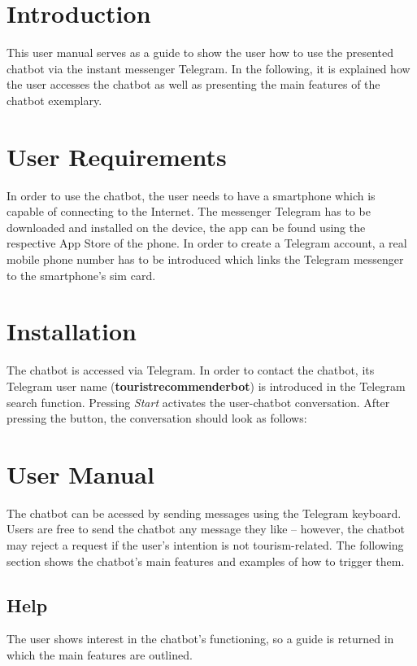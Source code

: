 
\section{Introduction}
This user manual serves as a guide to show the user how to use the presented chatbot via the instant messenger Telegram. In the following, it is explained how the user accesses the chatbot as well as presenting the main features of the chatbot exemplary. 

\section{User Requirements}
In order to use the chatbot, the user needs to have a smartphone which is capable of connecting to the Internet. The messenger Telegram has to be downloaded and installed on the device, the app can be found using the respective App Store of the phone. In order to create a Telegram account, a real mobile phone number has to be introduced which links the Telegram messenger to the smartphone's sim card. 

\section{Installation}
The chatbot is accessed via Telegram. In order to contact the chatbot, its Telegram user name (\textbf{touristrecommenderbot}) is introduced in the Telegram search function. Pressing \textit{Start} activates the user-chatbot conversation. After pressing the button, the conversation should look as follows:


\section{User Manual}
The chatbot can be acessed by sending messages using the Telegram keyboard. Users are free to send the chatbot any message they like – however, the chatbot may reject a request if the user’s intention is not tourism-related. The following section shows the chatbot’s main features and examples of how to trigger them.

\subsection{Help}
The user shows interest in the chatbot’s functioning, so a guide is returned in which the main features are outlined.

